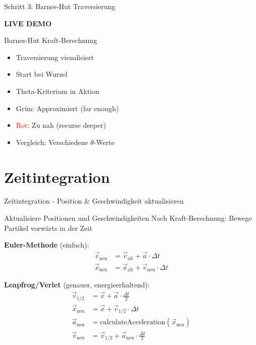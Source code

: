 \documentclass[xcolor=dvipsnames]{beamer}
\begin{document}
\begin{frame}{Schritt 3: Barnes-Hut Traversierung}
\begin{center}
\vspace{1.5cm}
{\Huge \textbf{LIVE DEMO}}

\vspace{1cm}
{\Large Barnes-Hut Kraft-Berechnung}

\vspace{0.5cm}
\begin{itemize}
    \item Traversierung visualisiert
    \item Start bei Wurzel
    \item Theta-Kriterium in Aktion
    \item \textcolor{green!50!black}{Grün}: Approximiert (far enough)
    \item \textcolor{red}{Rot}: Zu nah (recurse deeper)
    \item Vergleich: Verschiedene $\theta$-Werte
\end{itemize}
\end{center}
\end{frame}

\section{Zeitintegration}

\begin{frame}{Zeitintegration - Position \& Geschwindigkeit aktualisieren}
\begin{block}{Aktualisiere Positionen und Geschwindigkeiten}
Nach Kraft-Berechnung: Bewege Partikel vorwärts in der Zeit
\end{block}

\textbf{Euler-Methode} (einfach):
\begin{align}
\vec{v}_{\text{neu}} &= \vec{v}_{\text{alt}} + \vec{a} \cdot \Delta t \\
\vec{x}_{\text{neu}} &= \vec{x}_{\text{alt}} + \vec{v}_{\text{neu}} \cdot \Delta t
\end{align}

\textbf{Leapfrog/Verlet} (genauer, energieerhaltend):
\begin{align}
\vec{v}_{1/2} &= \vec{v} + \vec{a} \cdot \frac{\Delta t}{2} \\
\vec{x}_{\text{neu}} &= \vec{x} + \vec{v}_{1/2} \cdot \Delta t \\
\vec{a}_{\text{neu}} &= \text{calculateAcceleration}(\vec{x}_{\text{neu}}) \\
\vec{v}_{\text{neu}} &= \vec{v}_{1/2} + \vec{a}_{\text{neu}} \cdot \frac{\Delta t}{2}
\end{align}
\end{frame}
\end{document}
